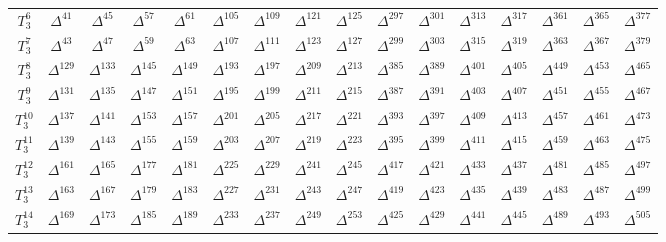 \begin{center}
\begin{tabular}{|c||c|c|c|c|c|c|c|c|c|c|c|c|c|c|c|}
		$T_3^{6}$ & $\Delta^{41}$ & $\Delta^{45}$ & $\Delta^{57}$ & $\Delta^{61}$ & $\Delta^{105}$ & $\Delta^{109}$ & $\Delta^{121}$ & $\Delta^{125}$ & $\Delta^{297}$ & $\Delta^{301}$ & $\Delta^{313}$ & $\Delta^{317}$ & $\Delta^{361}$ & $\Delta^{365}$ & $\Delta^{377}$ \\
		$T_3^{7}$ & $\Delta^{43}$ & $\Delta^{47}$ & $\Delta^{59}$ & $\Delta^{63}$ & $\Delta^{107}$ & $\Delta^{111}$ & $\Delta^{123}$ & $\Delta^{127}$ & $\Delta^{299}$ & $\Delta^{303}$ & $\Delta^{315}$ & $\Delta^{319}$ & $\Delta^{363}$ & $\Delta^{367}$ & $\Delta^{379}$ \\
		$T_3^{8}$ & $\Delta^{129}$ & $\Delta^{133}$ & $\Delta^{145}$ & $\Delta^{149}$ & $\Delta^{193}$ & $\Delta^{197}$ & $\Delta^{209}$ & $\Delta^{213}$ & $\Delta^{385}$ & $\Delta^{389}$ & $\Delta^{401}$ & $\Delta^{405}$ & $\Delta^{449}$ & $\Delta^{453}$ & $\Delta^{465}$ \\
		$T_3^{9}$ & $\Delta^{131}$ & $\Delta^{135}$ & $\Delta^{147}$ & $\Delta^{151}$ & $\Delta^{195}$ & $\Delta^{199}$ & $\Delta^{211}$ & $\Delta^{215}$ & $\Delta^{387}$ & $\Delta^{391}$ & $\Delta^{403}$ & $\Delta^{407}$ & $\Delta^{451}$ & $\Delta^{455}$ & $\Delta^{467}$ \\
		$T_3^{10}$ & $\Delta^{137}$ & $\Delta^{141}$ & $\Delta^{153}$ & $\Delta^{157}$ & $\Delta^{201}$ & $\Delta^{205}$ & $\Delta^{217}$ & $\Delta^{221}$ & $\Delta^{393}$ & $\Delta^{397}$ & $\Delta^{409}$ & $\Delta^{413}$ & $\Delta^{457}$ & $\Delta^{461}$ & $\Delta^{473}$ \\
		$T_3^{11}$ & $\Delta^{139}$ & $\Delta^{143}$ & $\Delta^{155}$ & $\Delta^{159}$ & $\Delta^{203}$ & $\Delta^{207}$ & $\Delta^{219}$ & $\Delta^{223}$ & $\Delta^{395}$ & $\Delta^{399}$ & $\Delta^{411}$ & $\Delta^{415}$ & $\Delta^{459}$ & $\Delta^{463}$ & $\Delta^{475}$ \\
		$T_3^{12}$ & $\Delta^{161}$ & $\Delta^{165}$ & $\Delta^{177}$ & $\Delta^{181}$ & $\Delta^{225}$ & $\Delta^{229}$ & $\Delta^{241}$ & $\Delta^{245}$ & $\Delta^{417}$ & $\Delta^{421}$ & $\Delta^{433}$ & $\Delta^{437}$ & $\Delta^{481}$ & $\Delta^{485}$ & $\Delta^{497}$ \\
		$T_3^{13}$ & $\Delta^{163}$ & $\Delta^{167}$ & $\Delta^{179}$ & $\Delta^{183}$ & $\Delta^{227}$ & $\Delta^{231}$ & $\Delta^{243}$ & $\Delta^{247}$ & $\Delta^{419}$ & $\Delta^{423}$ & $\Delta^{435}$ & $\Delta^{439}$ & $\Delta^{483}$ & $\Delta^{487}$ & $\Delta^{499}$ \\
		$T_3^{14}$ & $\Delta^{169}$ & $\Delta^{173}$ & $\Delta^{185}$ & $\Delta^{189}$ & $\Delta^{233}$ & $\Delta^{237}$ & $\Delta^{249}$ & $\Delta^{253}$ & $\Delta^{425}$ & $\Delta^{429}$ & $\Delta^{441}$ & $\Delta^{445}$ & $\Delta^{489}$ & $\Delta^{493}$ & $\Delta^{505}$ \\

\end{tabular}
\end{center}
